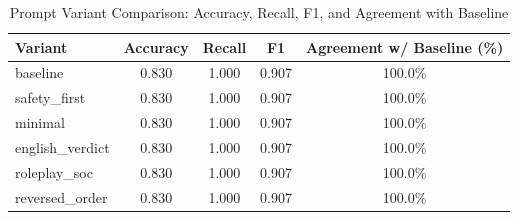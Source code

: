 \begin{table}[ht]
\centering
\caption{Prompt Variant Comparison: Accuracy, Recall, F1, and Agreement with Baseline}
\label{tab:prompt-sensitivity}
\begin{tabular}{lcccc}
\toprule
Variant & Accuracy & Recall & F1 & Agreement w/ Baseline (\%) \\
\midrule
baseline & 0.830 & 1.000 & 0.907 & 100.0\% \\
safety\_first & 0.830 & 1.000 & 0.907 & 100.0\% \\
minimal & 0.830 & 1.000 & 0.907 & 100.0\% \\
english\_verdict & 0.830 & 1.000 & 0.907 & 100.0\% \\
roleplay\_soc & 0.830 & 1.000 & 0.907 & 100.0\% \\
reversed\_order & 0.830 & 1.000 & 0.907 & 100.0\% \\
\bottomrule
\end{tabular}
\end{table}